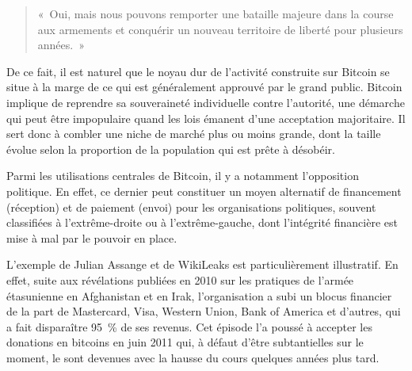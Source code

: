 \begin{quote}
«~Oui, mais nous pouvons remporter une bataille majeure dans la course aux armements et conquérir un nouveau territoire de liberté pour plusieurs années.~»
\end{quote}

De ce fait, il est naturel que le noyau dur de l'activité construite sur Bitcoin se situe à la marge de ce qui est généralement approuvé par le grand public. Bitcoin implique de reprendre sa souveraineté individuelle contre l'autorité, une démarche qui peut être impopulaire quand les lois émanent d'une acceptation majoritaire. Il sert donc à combler une niche de marché plus ou moins grande, dont la taille évolue selon la proportion de la population qui est prête à désobéir.


Parmi les utilisations centrales de Bitcoin, il y a notamment l'opposition politique. En effet, ce dernier peut constituer un moyen alternatif de financement (réception) et de paiement (envoi) pour les organisations politiques, souvent classifiées à l'extrême-droite ou à l'extrême-gauche, dont l'intégrité financière est mise à mal par le pouvoir en place.

L'exemple de Julian Assange et de WikiLeaks est particulièrement illustratif. En effet, suite aux révélations publiées en 2010 sur les pratiques de l'armée étasunienne en Afghanistan et en Irak, l'organisation a subi un blocus financier de la part de Mastercard, Visa, Western Union, Bank of America et d'autres, qui a fait disparaître 95~\% de ses revenus. Cet épisode l'a poussé à accepter les donations en bitcoins en juin 2011 qui, à défaut d'être subtantielles sur le moment, le sont devenues avec la hausse du cours quelques années plus tard.


